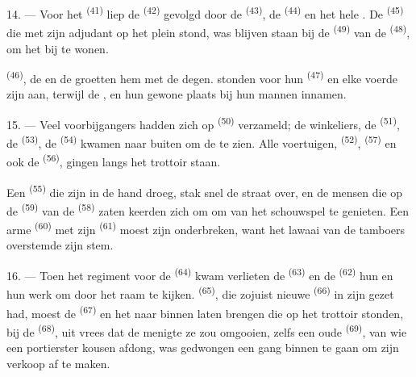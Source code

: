 \VUsaut{3.0mm}

14. --- Voor het  \textsuperscript{(41)} liep de
 \textsuperscript{(42)} gevolgd door de
 \textsuperscript{(43)}, de 
\textsuperscript{(44)} en het hele . De 
\textsuperscript{(45)} die met zijn adjudant op het plein stond, was blijven staan bij de
 \textsuperscript{(49)} van de
 \textsuperscript{(48)}, om het  bij te wonen.

 \textsuperscript{(46)}, de  en de
 groetten hem met de degen. 
stonden voor hun  \textsuperscript{(47)} en elke
 voerde zijn  aan, terwijl de
,  en  hun
gewone plaats bij hun mannen innamen.

15. --- Veel voorbijgangers hadden zich op  \textsuperscript{(50)}
verzameld; de winkeliers, de  \textsuperscript{(51)}, de 
\textsuperscript{(53)}, de
 \textsuperscript{(54)} kwamen naar buiten om de
 te zien. Alle voertuigen, 
\textsuperscript{(52)},  \textsuperscript{(57)} en ook de
 \textsuperscript{(56)}, gingen langs het trottoir staan.

\VUsaut{3.0mm}

Een  \textsuperscript{(55)} die zijn
 in de hand droeg, stak snel de straat over, en de mensen
die op de  \textsuperscript{(59)} van de 
\textsuperscript{(58)} zaten keerden zich om om van het schouwspel te genieten. Een arme
 \textsuperscript{(60)} met zijn 
\textsuperscript{(61)} moest zijn  onderbreken, want het lawaai van de tamboers
overstemde zijn stem.

16. --- Toen het regiment voor de  \textsuperscript{(64)} kwam verlieten
de  \textsuperscript{(63)} en de
 \textsuperscript{(62)} hun  en hun
werk om door het raam te kijken.  \textsuperscript{(65)}, die zojuist
nieuwe  \textsuperscript{(66)} in zijn
 gezet had, moest de  \textsuperscript{(67)}
en het  naar binnen laten brengen die op het trottoir stonden, bij de
 \textsuperscript{(68)}, uit vrees dat de menigte ze zou omgooien, zelfs
een oude  \textsuperscript{(69)}, van wie een portierster kousen afdong,
was gedwongen een gang binnen te gaan om zijn verkoop af te maken.

